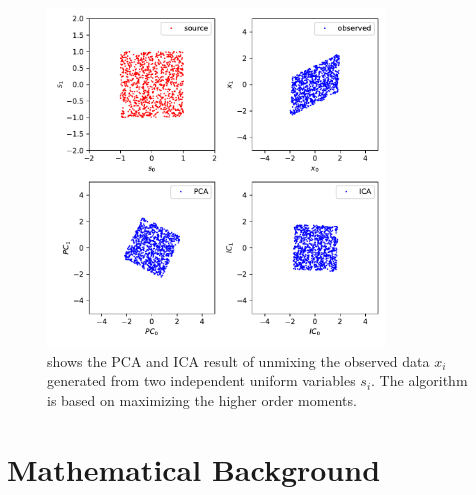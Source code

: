 \documentclass[aps,prl,preprint,superscriptaddress]{revtex4-2}
\begin{document}
\begin{figure}[b]
\includegraphics[width=0.8\textwidth]{scripts/ICA_vs_PCA.pdf}
 \caption{\label{fig:ICA_vs_PCA} shows the PCA and ICA result of unmixing the observed data $x_{i}$ generated from two independent uniform variables $s_{i}$. The algorithm is based on maximizing the higher order moments. }
\end{figure}

\section{Mathematical Background}
\end{document}
